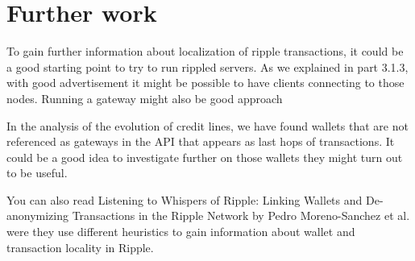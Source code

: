 \section{Further work}
To gain further information about localization of ripple transactions, it could be a good starting point to try to run rippled servers. As we explained in part 3.1.3, with good advertisement it might be possible to have clients connecting to those nodes. Running a gateway might also be good approach

In the analysis of the evolution of credit lines, we have found wallets that are not referenced as gateways in the API that appears as last hops of transactions. It could be a good idea to investigate further on those wallets they might turn out to be useful.

You can also read Listening to Whispers of Ripple: Linking Wallets and De-anonymizing Transactions in the Ripple Network by Pedro Moreno-Sanchez et al.\cite{ListeningtoWhispersofRipple} were they use different heuristics to gain information about wallet and transaction locality in Ripple.